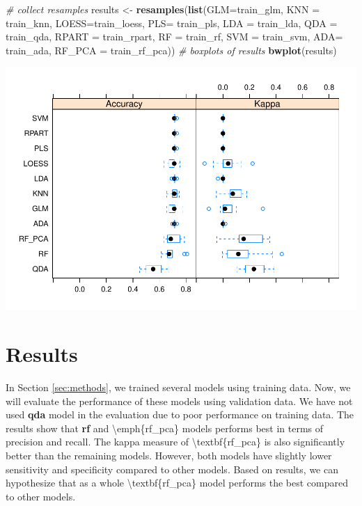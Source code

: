 \documentclass[]{article}
\newenvironment{Shaded}{\begin{snugshade}}{\end{snugshade}}
\newcommand{\CommentTok}[1]{\textcolor[rgb]{0.56,0.35,0.01}{\textit{#1}}}
\newcommand{\DataTypeTok}[1]{\textcolor[rgb]{0.13,0.29,0.53}{#1}}
\newcommand{\KeywordTok}[1]{\textcolor[rgb]{0.13,0.29,0.53}{\textbf{#1}}}
\newcommand{\NormalTok}[1]{#1}
\newcommand{\StringTok}[1]{\textcolor[rgb]{0.31,0.60,0.02}{#1}}
\begin{document}
\begin{Shaded}
\begin{Highlighting}[]
\CommentTok{# collect resamples}
\NormalTok{results <-}\StringTok{ }\KeywordTok{resamples}\NormalTok{(}\KeywordTok{list}\NormalTok{(}\DataTypeTok{GLM=}\NormalTok{train_glm, }
                          \DataTypeTok{KNN =}\NormalTok{ train_knn,}
                          \DataTypeTok{LOESS=}\NormalTok{train_loess,}
                          \DataTypeTok{PLS=}\NormalTok{ train_pls,}
                          \DataTypeTok{LDA =}\NormalTok{ train_lda,}
                          \DataTypeTok{QDA =}\NormalTok{ train_qda,}
                          \DataTypeTok{RPART =}\NormalTok{ train_rpart,}
                          \DataTypeTok{RF =}\NormalTok{ train_rf,}
                          \DataTypeTok{SVM =}\NormalTok{ train_svm,}
                          \DataTypeTok{ADA=}\NormalTok{ train_ada,}
                          \DataTypeTok{RF_PCA =}\NormalTok{ train_rf_pca))}
\CommentTok{# boxplots of results}
\KeywordTok{bwplot}\NormalTok{(results)}
\end{Highlighting}
\end{Shaded}

\includegraphics{LiverDisease_files/figure-latex/unnamed-chunk-37-1.pdf}

\section{Results}
\label{sec:results}

In Section \ref{sec:methods}, we trained several models using training
data. Now, we will evaluate the performance of these models using
validation data. We have not used \textbf{qda} model in the evaluation
due to poor performance on training data. The results show that
\textbf{rf} and \textbackslash emph\{rf\_pca\} models performs best in
terms of precision and recall. The kappa measure of
\textbackslash textbf\{rf\_pca\} is also significantly better than the
remaining models. However, both models have slightly lower sensitivity
and specificity compared to other models. Based on results, we can
hypothesize that as a whole \textbackslash textbf\{rf\_pca\} model
performs the best compared to other models.
\end{document}
